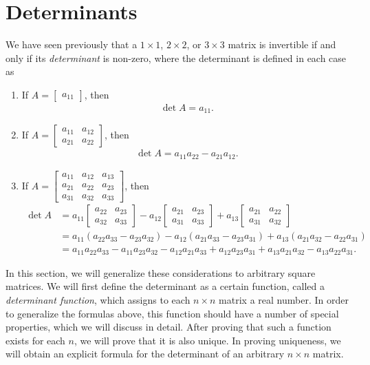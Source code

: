 \documentclass[12pt,letterpaper,reqno]{article}
\numberwithin{equation}{section}
\newcommand{\ti}[1]{\textit{#1}}
\begin{document}
\section{Determinants}
We have seen previously that a $1 \times 1$, $2 \times 2$, or $3 \times 3$ matrix is invertible if and only if its \ti{determinant} is non-zero, where the determinant is defined in each case as
\begin{enumerate}
	\item If $A=\begin{bmatrix} a_{11} \end{bmatrix}$, then 
	\begin{align*}
		\det A=a_{11}.
	\end{align*} 
	\item If $A=\begin{bmatrix}
		a_{11} & a_{12} \\ a_{21} & a_{22}
	\end{bmatrix}$, then 
	\begin{align*}
		\det A=a_{11}a_{22}-a_{21}a_{12}.
	\end{align*}
	\item If $A=\begin{bmatrix}
		a_{11} & a_{12} & a_{13} \\ a_{21} & a_{22} & a_{23} \\ a_{31} & a_{32} & a_{33}
	\end{bmatrix}$, then 
\begin{align*}
	\det A &=a_{11}\begin{bmatrix}
		a_{22} & a_{23} \\ a_{32} & a_{33}
	\end{bmatrix}-a_{12}\begin{bmatrix}
		a_{21} & a_{23} \\
		a_{31} & a_{33}
	\end{bmatrix}+a_{13}\begin{bmatrix}
		a_{21} & a_{22} \\ 
		a_{31} & a_{32}
	\end{bmatrix} \\
	&=a_{11}(a_{22}a_{33}-a_{23}a_{32})-a_{12}(a_{21}a_{33}-a_{23}a_{31})+a_{13}(a_{21}a_{32}-a_{22}a_{31}) \\
	&=a_{11}a_{22}a_{33}-a_{11}a_{23}a_{32}-a_{12}a_{21}a_{33}+a_{12}a_{23}a_{31}+a_{13}a_{21}a_{32}-a_{13}a_{22}a_{31}.
\end{align*}
\end{enumerate}

In this section, we will generalize these considerations to arbitrary square matrices. We will first define the determinant as a certain function, called a \ti{determinant function}, which assigns to each $n \times n$ matrix a real number. In order to generalize the formulas above, this function should have a number of special properties, which we will discuss in detail. After proving that such a function exists for each $n$, we will prove that it is also unique. In proving uniqueness, we will obtain an explicit formula for the determinant of an arbitrary $n \times n$ matrix.
\end{document}
